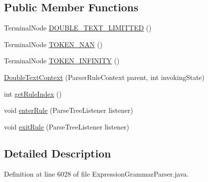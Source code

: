 \subsection*{Public Member Functions}
\begin{DoxyCompactItemize}
\item 
Terminal\+Node \hyperlink{classgov_1_1nasa_1_1jpf_1_1inspector_1_1server_1_1expression_1_1parser_1_1_expression_grammar_parser_1_1_double_text_context_a390b77f39e28714eb5cfc5311317cb5b}{D\+O\+U\+B\+L\+E\+\_\+\+T\+E\+X\+T\+\_\+\+L\+I\+M\+I\+T\+T\+ED} ()
\item 
Terminal\+Node \hyperlink{classgov_1_1nasa_1_1jpf_1_1inspector_1_1server_1_1expression_1_1parser_1_1_expression_grammar_parser_1_1_double_text_context_acfc9ac5fc261cffe609bd3674f0a86f6}{T\+O\+K\+E\+N\+\_\+\+N\+AN} ()
\item 
Terminal\+Node \hyperlink{classgov_1_1nasa_1_1jpf_1_1inspector_1_1server_1_1expression_1_1parser_1_1_expression_grammar_parser_1_1_double_text_context_a566c752038c6a33118e163834593422d}{T\+O\+K\+E\+N\+\_\+\+I\+N\+F\+I\+N\+I\+TY} ()
\item 
\hyperlink{classgov_1_1nasa_1_1jpf_1_1inspector_1_1server_1_1expression_1_1parser_1_1_expression_grammar_parser_1_1_double_text_context_a1979f64fa78d0f98edeb5843db8082d9}{Double\+Text\+Context} (Parser\+Rule\+Context parent, int invoking\+State)
\item 
int \hyperlink{classgov_1_1nasa_1_1jpf_1_1inspector_1_1server_1_1expression_1_1parser_1_1_expression_grammar_parser_1_1_double_text_context_ad75be2ce4c4995f7b5977c0ce21ed02d}{get\+Rule\+Index} ()
\item 
void \hyperlink{classgov_1_1nasa_1_1jpf_1_1inspector_1_1server_1_1expression_1_1parser_1_1_expression_grammar_parser_1_1_double_text_context_ab26442583f5fb08c5109707dbe72b1ca}{enter\+Rule} (Parse\+Tree\+Listener listener)
\item 
void \hyperlink{classgov_1_1nasa_1_1jpf_1_1inspector_1_1server_1_1expression_1_1parser_1_1_expression_grammar_parser_1_1_double_text_context_ab964cb26c96bc199940339c7a28f26be}{exit\+Rule} (Parse\+Tree\+Listener listener)
\end{DoxyCompactItemize}


\subsection{Detailed Description}


Definition at line 6028 of file Expression\+Grammar\+Parser.\+java.



